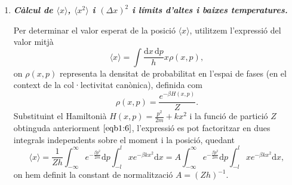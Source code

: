 \documentclass[a4paper, 10pt]{article}
\begin{document}
\begin{enumerate}
\begin{enumerate}
	Al límit de baixes temperatures, la partícula es comporta com un oscil·lador harmònic clàssic pur perquè no té prou energia per arribar a les parets del sistema, presentant dos termes quadràtics en el Hamiltonià, el de l'energia cinètica, $\frac{p^2}{2m}$, i el del potencial elàstic, $kx^2$, que ens dona un resultat per a l'energia mitjana total de $k_B T$, segons el teorema d'equipartició. En canvi, en el límit d'altes temperatures, l'energia tèrmica domina sobre la potencial elàstica, fent que el sistema es comporti com una partícula lliure en una caixa (essent el potencial $V=0$ dins de la caixa i $V\rightarrow \infty$ fora d'aquesta), ja que l'efecte de les molles esdevé negligible i només el de les parets (i l'associat a l'energia cinètica de la partícula) són rellevants. Sota aquestes condicions el potencial, doncs, deixa de ser quadràtic i, per tant, només el grau de llibertat cinètic es manté rellevant. Això últim, segons el teorema d'equipartició, resulta en una energia mitjana de $\frac{1}{2}k_BT$.
\end{enumerate}



	\item \textbf{\textit{Càlcul de $\langle x \rangle$, $\langle x^2 \rangle$ i $(\Delta x)^2$ i límits d'altes i baixes temperatures.}}
	
	Per determinar el valor esperat de la posició $\langle x \rangle$, utilitzem l'expressió del valor mitjà 
	\begin{equation}
		\langle x \rangle = \int \frac{\mathrm{d}x \, \mathrm{d}p}{h} x \rho(x,p),
	\end{equation}
	on $\rho(x,p)$ representa la densitat de probabilitat en l'espai de fases (en el context de la col·lectivitat canònica), definida com
	\begin{equation}
		\rho(x,p) = \frac{e^{-\beta H(x,p)}}{Z}.
	\end{equation}
	Substituint el Hamiltonià $H(x,p) = \frac{p^2}{2m} + kx^2$ i la funció de partició $Z$ obtinguda anteriorment $ \eqref{eqb1:6}$, l'expressió es pot factoritzar en dues integrals independents sobre el moment i la posició, quedant
	\begin{equation}
		\langle x \rangle = \frac{1}{Z h} \int_{-\infty}^{\infty} e^{-\frac{\beta p^2}{2m}} \mathrm{d}p \int_{-l}^{l} x e^{-\beta k x^2} \mathrm{d}x = A \int_{-\infty}^{\infty} e^{-\frac{\beta p^2}{2m}} \mathrm{d}p \int_{-l}^{l} x e^{-\beta k x^2} \mathrm{d}x,
	\end{equation}
	on hem definit la constant de normalització $A = (Z h)^{-1}$. 
	

\end{enumerate}
\end{document}
